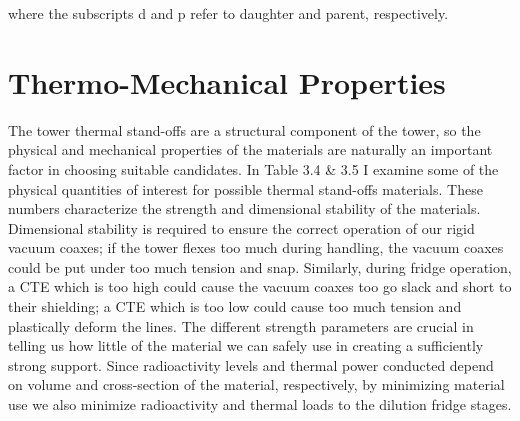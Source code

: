 \documentclass{report}
\begin{document}
where the subscripts d and p refer to daughter and parent, respectively.

\section{Thermo-Mechanical Properties}

The tower thermal stand-offs are a structural component of the tower, so the physical and mechanical properties of the materials are naturally an important factor in choosing suitable candidates. In Table 3.4 \& 3.5 I examine some of the physical quantities of interest for possible thermal stand-offs materials. These numbers characterize the strength and dimensional stability of the materials. Dimensional stability is required to ensure the correct operation of our rigid vacuum coaxes; if the tower flexes too much during handling, the vacuum coaxes could be put under too much tension and snap. Similarly, during fridge operation, a CTE which is too high could cause the vacuum coaxes too go slack and short to their shielding; a CTE which is too low could cause too much tension and plastically deform the lines. The different strength parameters are crucial in telling us how little of the material we can safely use in creating a sufficiently strong support. Since radioactivity levels and thermal power conducted depend on volume and cross-section of the material, respectively, by minimizing material use we also minimize radioactivity and thermal loads to the dilution fridge stages.
\end{document}
